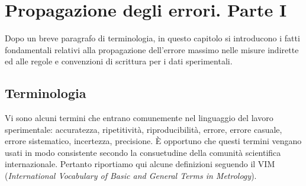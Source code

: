 \chapter{Propagazione degli errori. Parte I}
\label{chap:PropagazioneDegliErrori1}
\mt

Dopo un breve paragrafo di terminologia, in questo capitolo si
introducono i fatti fondamentali relativi alla propagazione dell'errore
massimo nelle misure indirette ed alle regole e convenzioni di scrittura
per i dati sperimentali.


\section{Terminologia}

Vi sono alcuni termini che entrano  comunemente  nel linguaggio del lavoro
sperimentale: accuratezza, ripetitivit\`a, riproducibilit\`a,  errore, errore
casuale, errore sistematico, incertezza, precisione.
\` E opportuno che questi termini vengano usati in modo consistente secondo
la consuetudine della comunit\`a scientifica internazionale.
Pertanto riportiamo qui alcune definizioni seguendo il VIM
({\em International Vocabulary of Basic and General Terms in Metrology}).

